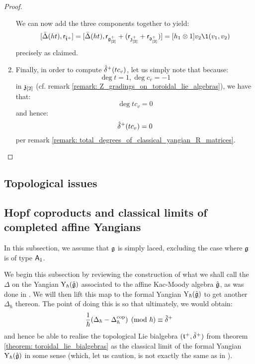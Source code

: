 \begin{proof}
\begin{enumerate}
                    We can now add the three components together to yield:
                        $$[\bar{\Delta}(ht), \sfr_{\extendedtoroidal^{\positive}}] = [ \bar{\Delta}(ht), \sfr_{\g_{[2]}^{\positive}} + (\sfr_{\z_{[2]}^{\positive}} + \sfr_{\d_{[2]}^{\positive}}) ] =  [h_1 \tensor 1] v_2 \1(v_1, v_2)$$
                    precisely as claimed. 
                    
                    \item Finally, in order to compute $\hat{\delta}^{+}(t c_v)$, let us simply note that because:
                        $$\deg t = 1, \deg c_v = -1$$
                    in $\mathfrak{z}_{[2]}$ (cf. remark \ref{remark: Z_gradings_on_toroidal_lie_algebras}), we have that:
                        $$\deg t c_v = 0$$
                    and hence:
                        $$\hat{\delta}^{+}(t c_v) = 0$$
                    per remark \ref{remark: total_degrees_of_classical_yangian_R_matrices}.
                \end{enumerate}
            \end{proof}

    \subsection{Topological issues}
    
    \subsection{Hopf coproducts and classical limits of completed affine Yangians}
        \begin{convention}
            In this subsection, we assume that $\mathfrak{g}$ is simply laced, excluding the case where $\mathfrak{g}$ is of type $\mathsf{A}_1$. 
        \end{convention}

        We begin this subsection by reviewing the construction of what we shall call the  $\Delta$ on the Yangian $\mathrm{Y}_{\hbar}(\hat{\mathfrak{g}})$ associated to the affine Kac-Moody algebra $\hat{\mathfrak{g}}$, as was done in \cite[Sections 4 and 5]{guay_nakajima_wendlandt_affine_yangian_coproduct}. We will then lift this map to the formal Yangian $\mathrm{Y}_{\hbar}(\hat{\mathfrak{g}})$ to get another  $\Delta_{\hbar}$ thereon. The point of doing this is so that ultimately, we would obtain:
            $$\frac{1}{\hbar}(\Delta_{\hbar} - \Delta_{\hbar}^{\mathrm{cop}}) \pmod{\hbar} \equiv \tilde{\delta}^{+}$$
        and hence be able to realise the topological Lie bialgebra $(\mathfrak{t}^{+}, \tilde{\delta}^{+})$ from theorem \ref{theorem: toroidal_lie_bialgebras} as the classical limit of the formal Yangian $\mathrm{Y}_{\hbar}(\hat{\mathfrak{g}})$ in some sense (which, let us caution, is not exactly the same as in \cite{etingof_kazhdan_quantisation_1}).
        
